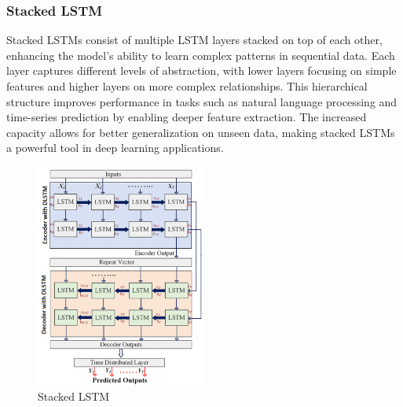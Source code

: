 \documentclass[nonacm,sigconf]{acmart}
\begin{document}
\subsubsection{\textbf{Stacked LSTM}}
Stacked LSTMs consist of multiple LSTM layers stacked on top of each other, enhancing the model's ability to learn complex patterns in sequential data. Each layer captures different levels of abstraction, with lower layers focusing on simple features and higher layers on more complex relationships. This hierarchical structure improves performance in tasks such as natural language processing and time-series prediction by enabling deeper feature extraction. The increased capacity allows for better generalization on unseen data, making stacked LSTMs a powerful tool in deep learning applications.
\begin{figure}[h]
  \centering
  \includegraphics[width=0.5\textwidth]{LSTMs/stacked.png}
  \caption{Stacked LSTM}
\end{figure}
\end{document}
